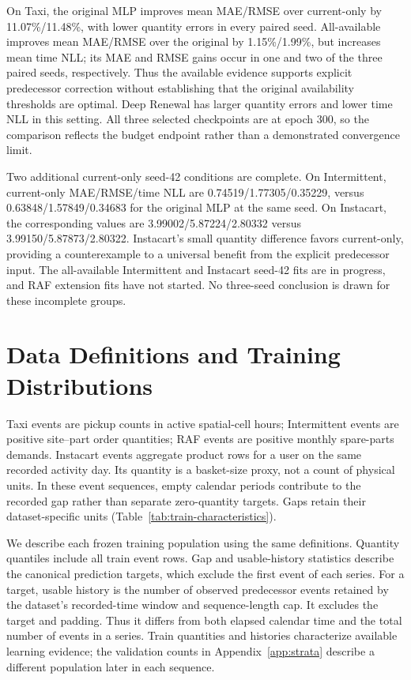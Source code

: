 \documentclass[runningheads]{llncs}
\begin{document}
On Taxi, the original MLP improves mean MAE/RMSE over current-only by
11.07\%/11.48\%, with lower quantity errors in every paired seed.
All-available improves mean MAE/RMSE over the original by 1.15\%/1.99\%,
but increases mean time NLL; its MAE and RMSE gains occur in one and two
of the three paired seeds, respectively. Thus the available evidence
supports explicit predecessor correction without establishing that the
original availability thresholds are optimal. Deep Renewal has larger
quantity errors and lower time NLL in this setting. All three selected
checkpoints are at epoch 300, so the comparison reflects the budget endpoint
rather than a demonstrated convergence limit.

Two additional current-only seed-42 conditions are complete. On Intermittent,
current-only MAE/RMSE/time NLL are 0.74519/1.77305/0.35229, versus
0.63848/1.57849/0.34683 for the original MLP at the same seed. On Instacart,
the corresponding values are 3.99002/5.87224/2.80332 versus
3.99150/5.87873/2.80322. Instacart's small quantity difference favors
current-only, providing a counterexample to a universal benefit from the
explicit predecessor input. The all-available Intermittent and Instacart
seed-42 fits are in progress, and RAF extension fits have not started.
No three-seed conclusion is drawn for these incomplete groups.


\section{Data Definitions and Training Distributions}\label{app:data-characteristics}
Taxi events are pickup counts in active spatial-cell hours; Intermittent
events are positive site--part order quantities; RAF events are positive
monthly spare-parts demands. Instacart events aggregate product rows for a
user on the same recorded activity day. Its quantity is a basket-size proxy,
not a count of physical units. In these event sequences, empty calendar
periods contribute to the recorded gap rather than separate zero-quantity
targets. Gaps retain their dataset-specific units (Table~\ref{tab:train-characteristics}).

We describe each frozen training population using the same definitions.
Quantity quantiles include all train event rows. Gap and usable-history
statistics describe the canonical prediction targets, which exclude the
first event of each series. For a target, usable history is the number of
observed predecessor events retained by the dataset's recorded-time window
and sequence-length cap. It excludes the target and padding. Thus it differs
from both elapsed calendar time and the total number of events in a series.
Train quantities and histories characterize available learning evidence;
the validation counts in Appendix~\ref{app:strata} describe a different
population later in each sequence.
\end{document}
